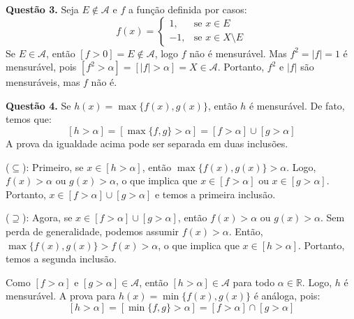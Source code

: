 \documentclass[12pt, a4paper]{article}
\newenvironment{solution}[1]{\par\vspace{1.2em}\noindent\textbf{Questão #1.}}{\par\vspace{0.5em}}
\newcommand{\R}{\mathbb{R}}
\newcommand{\A}{\mathcal{A}}
\begin{document}
\begin{solution}{3}
    Seja $E \notin \A$ e $f$ a função definida por casos:
    \[
        f(x) = 
        \begin{cases}
            1, & \text{se } x \in {E} \\
            -1, & \text{se } x \in X \setminus E
        \end{cases}    
    \]
    Se $E \in \A$, então $[f > 0] = E \notin \A$, logo $f$ não é mensurável. Mas $f^2 = |f| = 1$ é mensurável, pois $[f^2 > \alpha] = [|f| > \alpha]= X \in \A$. Portanto, $f^2$ e $|f|$ são mensuráveis, mas $f$ não é.
\end{solution}
\begin{solution}{4}
    Se $h(x) = \max\{f(x), g(x)\}$, então $h$ é mensurável. De fato, temos que:
    \[
        [h > \alpha] = [\max\{f, g\} > \alpha] = [f > \alpha] \cup [g > \alpha]
    \]
    A prova da igualdade acima pode ser separada em duas inclusões.
    
    ($\subseteq$): Primeiro, se $x \in [h > \alpha]$, então $\max\{f(x), g(x)\} > \alpha$. Logo, $f(x) > \alpha$ ou $g(x) > \alpha$, o que implica que $x \in [f > \alpha]$ ou $x \in [g > \alpha]$. Portanto, $x \in [f > \alpha] \cup [g > \alpha]$ e temos a primeira inclusão.

    ($\supseteq$): Agora, se $x \in [f > \alpha] \cup [g > \alpha]$, então $f(x) > \alpha$ ou $g(x) > \alpha$. Sem perda de generalidade, podemos assumir $f(x) > \alpha$. Então, $\max\{f(x), g(x)\} > f(x) > \alpha$, o que implica que $x \in [h > \alpha]$. Portanto, temos a segunda inclusão.

    Como $[f > \alpha]$ e $[g > \alpha] \in \A$, então $[h > \alpha]\in \A$  para todo $\alpha \in \R$. Logo, $h$ é mensurável.
    A prova para $h(x) = \min\{f(x), g(x)\}$ é análoga, pois:
    \[
        [h > \alpha] = [\min\{f, g\} > \alpha] = [f > \alpha] \cap [g > \alpha]
    \]
\end{solution}
\end{document}
